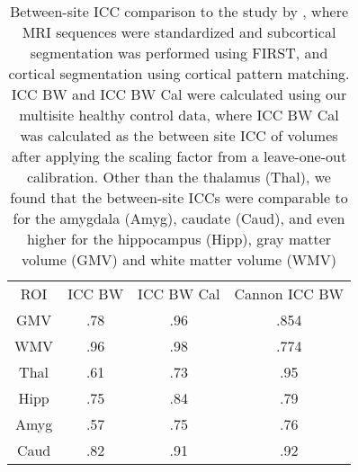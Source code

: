 \begin{table} 
    \begin{tabular}{ c c c c }
        ROI & ICC BW & ICC BW Cal & Cannon \cite{cannon2014} ICC BW \\ 
        GMV & .78 & .96 & .854 \\ 
        WMV & .96 & .98 & .774 \\ 
        Thal & .61 & .73 & .95 \\ 
        Hipp & .75 & .84 & .79 \\ 
        Amyg & .57 & .75 & .76 \\ 
        Caud & .82 & .91 & .92 \\ 
    \end{tabular} 
    \caption{Between-site ICC comparison to the study by \cite{cannon2014}, where MRI sequences were standardized and subcortical segmentation was performed using FIRST, and cortical segmentation using cortical pattern matching. ICC BW and ICC BW Cal were calculated using our multisite healthy control data, where ICC BW Cal was calculated as the between site ICC of volumes after applying the scaling factor from a leave-one-out calibration. Other than the thalamus (Thal), we found that the between-site ICCs were comparable to \cite{cannon2014} for the amygdala (Amyg), caudate (Caud), and even higher for the hippocampus (Hipp), gray matter volume (GMV) and white matter volume (WMV)} 
\label{comparetocannon}
\end{table}